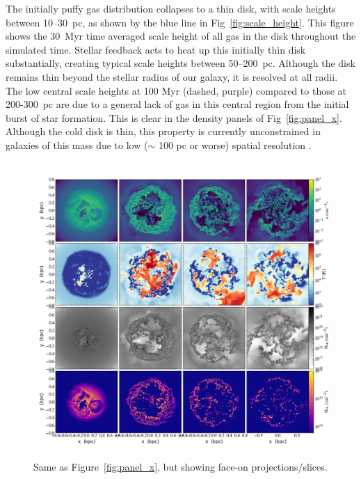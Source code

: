\documentclass[twocolumn]{aastex61}
\begin{document}
The initially puffy gas distribution collapses to a thin disk, with scale heights between 10--30~pc, as shown by the blue line in Fig~\ref{fig:scale_height}. This figure shows the 30~Myr time averaged scale height of all gas in the disk throughout the simulated time. Stellar feedback acts to heat up this initially thin disk substantially, creating typical scale heights between 50--200~pc. Although the disk remains thin beyond the stellar radius of our galaxy, it is resolved at all radii. The low central scale heights at 100 Myr (dashed, purple) compared to those at 200-300~pc are due to a general lack of gas in this central region from the initial burst of star formation. This is clear in the density panels of Fig~\ref{fig:panel_x}. Although the cold disk is thin, this property is currently unconstrained in galaxies of this mass due to low ($\sim$ 100 pc or worse) spatial resolution \citep[e.g.][]{Bernstein-Cooper2014}.

\begin{figure}
\centering
\includegraphics[width=0.975\linewidth]{multiplot_4x4_z.png}
\caption{Same as Figure~\ref{fig:panel_x}, but showing face-on projections/slices.}
\label{fig:panel_z}
\end{figure}
\end{document}
